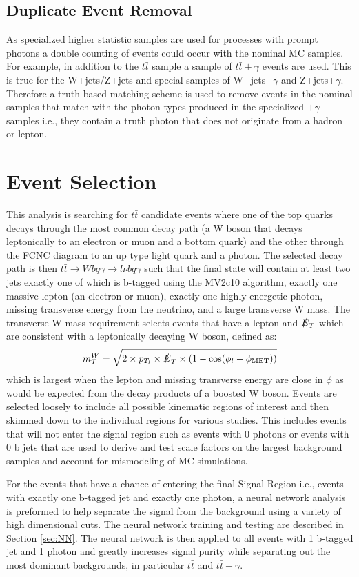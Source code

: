 \subsection{Duplicate Event Removal}
As specialized higher statistic samples are used for processes with prompt photons a double counting of events could occur with the nominal MC samples.  For example, in addition to the $t\bar{t}$ sample a sample of $t\bar{t}+\gamma$ events are used.  This is true for the W+jets/Z+jets and special samples of W+jets+$\gamma$ and Z+jets+$\gamma$.  Therefore a truth based matching scheme is used to remove events in the nominal samples that match with the photon types produced in the specialized $+\gamma$ samples i.e., they contain a truth photon that does not originate from a hadron or lepton.

\section{Event Selection}
This analysis is searching for $t\bar{t}$ candidate events where one of the top quarks decays through the most common decay path (a W boson that decays leptonically to an electron or muon and a bottom quark) and the other through the FCNC diagram to an up type light quark and a photon.  The selected decay path is then $t\bar{t} \rightarrow Wbq\gamma \rightarrow l\nu b q \gamma$ such that the final state will contain at least two jets exactly one of which is b-tagged using the MV2c10 algorithm, exactly one massive lepton (an electron or muon), exactly one highly energetic photon, missing transverse energy from the neutrino, and a large transverse W mass.  The transverse W mass requirement selects events that have a lepton and $\slashed{E}_T$ which are consistent with a leptonically decaying W boson, defined as:
\[ m_T^{W} =  \sqrt{2\times p_{T_l}\times \slashed{E}_T \times (1 - \text{cos}(\phi_l -\phi_{\text{MET}}))}\]
which is largest when the lepton and missing transverse energy are close in $\phi$ as would be expected from the decay products of a boosted W boson.  Events are selected loosely to include all possible kinematic regions of interest and then skimmed down to the individual regions for various studies.  This includes events that will not enter the signal region such as events with 0 photons or events with 0 b jets that are used to derive and test scale factors on the largest background samples and account for mismodeling of MC simulations. 

For the events that have a chance of entering the final Signal Region i.e., events with exactly one b-tagged jet and exactly one photon, a neural network analysis is preformed to help separate the signal from the background using a variety of high dimensional cuts.  The neural network training and testing are described in Section \ref{sec:NN}.  The neural network is then applied to all events with 1 b-tagged jet and 1 photon and greatly increases signal purity while separating out the most dominant backgrounds, in particular $t\bar{t}$ and $t\bar{t}+\gamma$.


